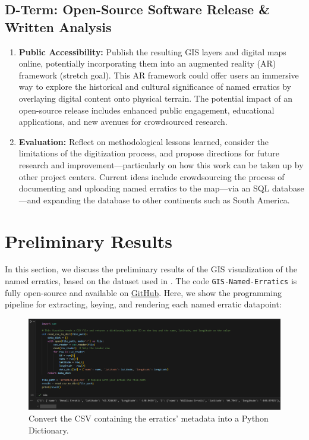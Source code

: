 \documentclass{article}
\begin{document}
\subsection{D-Term: Open-Source Software Release \& Written Analysis}
\begin{enumerate}
    \item \textbf{Public Accessibility:} Publish the resulting GIS layers and digital maps online, potentially incorporating them into an augmented reality (AR) framework (stretch goal). This AR framework could offer users an immersive way to explore the historical and cultural significance of named erratics by overlaying digital content onto physical terrain. The potential impact of an open-source release includes enhanced public engagement, educational applications, and new avenues for crowdsourced research.

    \item \textbf{Evaluation:} Reflect on methodological lessons learned, consider the limitations of the digitization process, and propose directions for future research and improvement---particularly on how this work can be taken up by other project centers. Current ideas include crowdsourcing the process of documenting and uploading named erratics to the map---via an SQL database---and expanding the database to other continents such as South America.
\end{enumerate}

\section{Preliminary Results}
In this section, we discuss the preliminary results of the GIS visualization of the named erratics, based on the dataset used in \cite{Hutton2012}. The code \texttt{GIS-Named-Erratics} is fully open-source and available on \href{https://github.com/echandler5956f/GIS-Named-Erratics}{GitHub}.
Here, we show the programming pipeline for extracting, keying, and rendering each named erratic datapoint:

\begin{figure}[H]
    \centering
    \includegraphics[width=1.0\textwidth]{Images/CodeSnippet1.png}
    \caption{Convert the CSV containing the erratics' metadata into a Python Dictionary.}
    \label{fig:1}
\end{figure}
\end{document}
